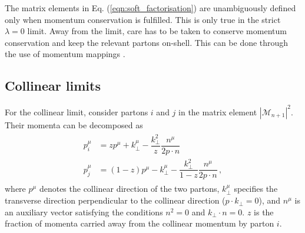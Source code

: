 \documentclass[main.tex]{subfiles}
\begin{document}
    The matrix elements in Eq. (\ref{eqn:soft_factorisation}) are
    unambiguously defined only when momentum conservation is
    fulfilled. This is only true in the strict $\lambda = 0$
    limit. Away from the limit, care has to be taken to conserve
    momentum conservation and keep the relevant partons on-shell.
    This can be done through the use of momentum mappings
    \cite{Catani:1996vz,Kosower:1997zr}.

\subsection{Collinear limits}\label{sec:me_collinear}
    For the collinear limit, consider partons $i$ and
    $j$ in the matrix element $|\mathcal{M}_{n+1}|^{2}$.
    Their momenta can be decomposed as
    \begin{align}\label{eqn:F_collinear_momenta}
        \begin{split}
        p_{i}^{\mu} &= z p^{\mu} + k_{\perp}^{\mu} - \dfrac{k_{\perp}^{2}}{z} \dfrac{n^{\mu}}{2 p \cdot n} \, \\
        p_{j}^{\mu} &= (1-z) p^{\mu} - k_{\perp}^{\mu} - \dfrac{k_{\perp}^{2}}{1-z}\dfrac{n^{\mu}}{2 p \cdot n} \, , 
        \end{split}
    \end{align}
    where $p^{\mu}$ denotes the collinear direction
    of the two partons, $k_{\perp}^{\mu}$ specifies
    the transverse direction perpendicular to the
    collinear direction ($p \cdot k_{\perp} = 0$), and $n^{\mu}$ is an auxiliary
    vector satisfying the conditions $n^{2} = 0$ and $k_{\perp} \cdot n = 0$.
    $z$ is the fraction of momenta carried away from
    the collinear momentum by parton $i$.
    
\end{document}
